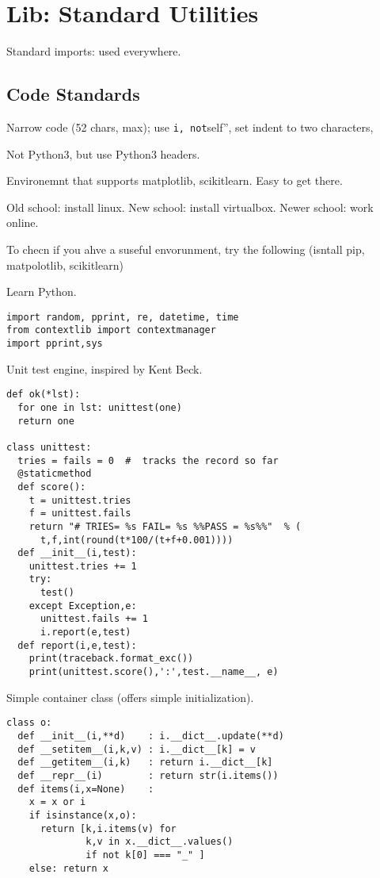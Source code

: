 \section{Lib: Standard Utilities}\label{lib-standard-utilities}

Standard imports: used everywhere.

\subsection{Code Standards}\label{code-standards}

Narrow code (52 chars, max); use
\texttt{i\textquotesingle{}\textquotesingle{},\ not}self'', set indent
to two characters,

Not Python3, but use Python3 headers.

Environemnt that supports matplotlib, scikitlearn. Easy to get there.

Old school: install linux. New school: install virtualbox. Newer school:
work online.

To checn if you ahve a suseful envorunment, try the following (isntall
pip, matpolotlib, scikitlearn)

Learn Python.

\begin{lstlisting}
import random, pprint, re, datetime, time
from contextlib import contextmanager
import pprint,sys
\end{lstlisting}

Unit test engine, inspired by Kent Beck.

\begin{lstlisting}
def ok(*lst):
  for one in lst: unittest(one)
  return one

class unittest:
  tries = fails = 0  #  tracks the record so far
  @staticmethod
  def score():
    t = unittest.tries
    f = unittest.fails
    return "# TRIES= %s FAIL= %s %%PASS = %s%%"  % (
      t,f,int(round(t*100/(t+f+0.001))))
  def __init__(i,test):
    unittest.tries += 1
    try:
      test()
    except Exception,e:
      unittest.fails += 1
      i.report(e,test)
  def report(i,e,test):
    print(traceback.format_exc())
    print(unittest.score(),':',test.__name__, e)
\end{lstlisting}

Simple container class (offers simple initialization).

\begin{lstlisting}
class o:
  def __init__(i,**d)    : i.__dict__.update(**d)
  def __setitem__(i,k,v) : i.__dict__[k] = v
  def __getitem__(i,k)   : return i.__dict__[k]
  def __repr__(i)        : return str(i.items())
  def items(i,x=None)    :
    x = x or i
    if isinstance(x,o):
      return [k,i.items(v) for
              k,v in x.__dict__.values()
              if not k[0] === "_" ]
    else: return x
\end{lstlisting}

